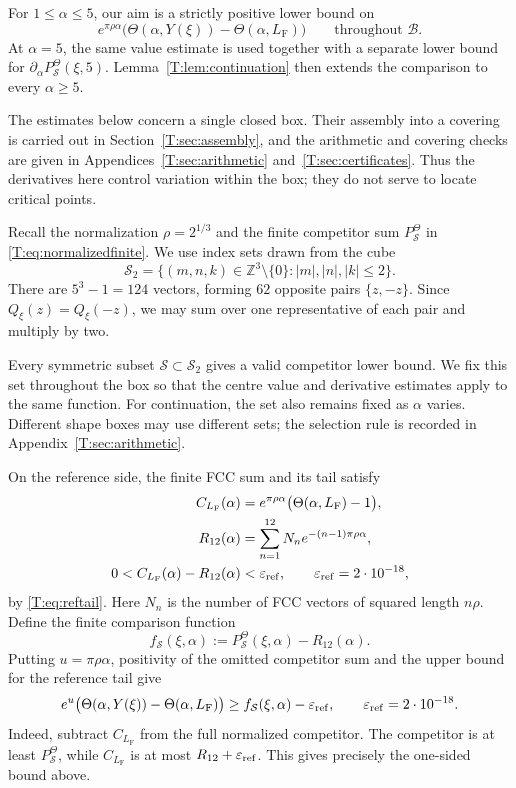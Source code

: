 \documentclass[reqno,english]{amsart}
\theoremstyle{definition}
\newtheorem{open problem}[theorem]{Open Problem}
\theoremstyle{remark}
\theoremstyle{plain}
\numberwithin{equation}{section}
\newcommand{\Z}{\mathbb Z}
\newcommand{\FCC}{L_{\mathrm F}}
\newcommand{\Th}{\Theta}
\newcommand{\epsref}{\varepsilon_{\rm ref}}
\begin{document}
For $1\le\alpha\le5$, our aim is a strictly positive lower bound on
\[
 e^{\pi\rho\alpha}
 \bigl(\Th(\alpha,Y(\xi))-\Th(\alpha,\FCC)\bigr)
 \qquad\text{throughout }\mathcal B.
\]
At $\alpha=5$, the same value estimate is used together with a
separate lower bound for
$\partial_\alpha P^{\Theta}_{\mathcal S}(\xi,5)$.
Lemma~\ref{T:lem:continuation} then extends the comparison to every
$\alpha\ge5$.

The estimates below concern a single closed box. Their assembly into
a covering is carried out in Section~\ref{T:sec:assembly}, and the
arithmetic and covering checks are given in
Appendices~\ref{T:sec:arithmetic} and~\ref{T:sec:certificates}.
Thus the derivatives here control variation within the box; they do
not serve to locate critical points.


Recall the normalization $\rho=2^{1/3}$ and the finite competitor sum
$P^{\Theta}_{\mathcal S}$ in \eqref{T:eq:normalizedfinite}.
We use index sets drawn from the cube
\begin{equation}\label{T:eq:cube}
 \mathcal S_2=
 \{(m,n,k)\in\Z^3\setminus\{0\}:|m|,|n|,|k|\le2\}.
\end{equation}
There are $5^3-1=124$ vectors, forming $62$ opposite pairs
$\{z,-z\}$. Since $Q_\xi(z)=Q_\xi(-z)$, we may sum over one
representative of each pair and multiply by two.

Every symmetric subset $\mathcal S\subset\mathcal S_2$ gives a
valid competitor lower bound. We fix this set throughout the box so
that the centre value and derivative estimates apply to the same
function. For continuation, the set also remains fixed as $\alpha$
varies. Different shape boxes may use different sets; the selection
rule is recorded in Appendix~\ref{T:sec:arithmetic}.

On the reference side, the finite FCC sum and its tail satisfy
\[
 \begin{aligned}
 C_{\FCC}(\alpha)
 &=e^{\pi\rho\alpha}\bigl(\Th(\alpha,\FCC)-1\bigr),\\
 R_{12}(\alpha)
 &=\sum_{n=1}^{12}N_n e^{-(n-1)\pi\rho\alpha},\\
 0<C_{\FCC}(\alpha)-R_{12}(\alpha)&<\epsref,
 \qquad \epsref=2\cdot10^{-18},
 \end{aligned}
\]
by \eqref{T:eq:reftail}. Here $N_n$ is the number of FCC vectors of
squared length $n\rho$. Define the finite comparison function
\begin{equation}\label{T:eq:fbox}
 f_{\mathcal S}(\xi,\alpha)
 :=P^{\Theta}_{\mathcal S}(\xi,\alpha)-R_{12}(\alpha).
\end{equation}
Putting $u=\pi\rho\alpha$, positivity of the omitted competitor sum and
the upper bound for the reference tail give
\begin{equation}\label{T:eq:fboxlower}
 e^u\bigl(\Th(\alpha,Y(\xi))-\Th(\alpha,\FCC)\bigr)
 \ge f_{\mathcal S}(\xi,\alpha)-\epsref,
 \qquad \epsref=2\cdot10^{-18}.
\end{equation}
Indeed, subtract $C_{\FCC}$ from the full normalized competitor.
The competitor is at least $P^{\Theta}_{\mathcal S}$, while
$C_{\FCC}$ is at most $R_{12}+\epsref$. This gives precisely the
one-sided bound above.
\end{document}
